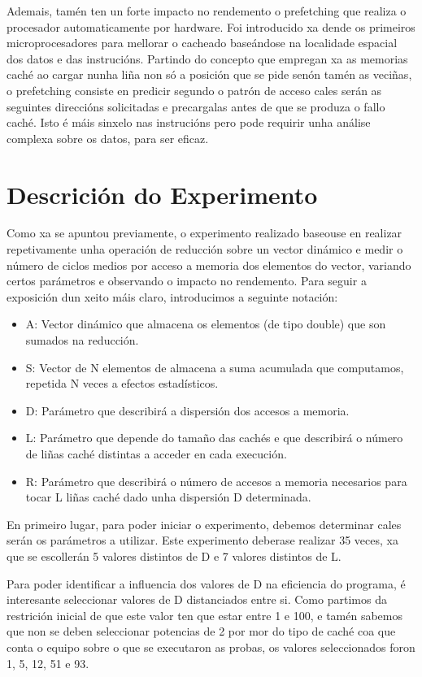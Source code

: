 \documentclass[letterpaper, 10 pt,spanish, conference]{ieeeconf}  %
\begin{document}
Ademais, tamén ten un forte impacto no rendemento o prefetching que realiza o procesador automaticamente por hardware. Foi introducido xa dende os primeiros microprocesadores para mellorar o cacheado baseándose na localidade espacial dos datos e das instrucións. Partindo do concepto que empregan xa as memorias caché ao cargar nunha liña non só a posición que se pide senón tamén as veciñas, o prefetching consiste en predicir segundo o patrón de acceso cales serán as seguintes direccións solicitadas e precargalas antes de que se produza o fallo caché. Isto é máis sinxelo nas instrucións pero pode requirir unha análise complexa sobre os datos, para ser eficaz.

\section{Descrición do Experimento}

Como xa se apuntou previamente, o experimento realizado baseouse en realizar repetivamente unha operación de reducción sobre un vector dinámico e medir o número de ciclos medios por acceso a memoria dos elementos do vector, variando certos parámetros e observando o impacto no rendemento. Para seguir a exposición dun xeito máis claro, introducimos a seguinte notación:

\begin{itemize}
    \item A: Vector dinámico que almacena os elementos (de tipo double) que son sumados na reducción.
    \item S: Vector de N elementos de almacena a suma acumulada que computamos, repetida N veces a efectos estadísticos.
    \item D: Parámetro que describirá a dispersión dos accesos a memoria.
    \item L: Parámetro que depende do tamaño das cachés e que describirá o número de liñas caché distintas a acceder en cada execución.
    \item R: Parámetro que describirá o número de accesos a memoria necesarios para tocar L liñas caché dado unha dispersión D determinada.
\end{itemize}

    En primeiro lugar, para poder iniciar o experimento,
    debemos determinar cales serán os parámetros a utilizar. Este experimento deberase realizar 35 veces, xa que se escollerán 5 valores distintos de D e 7 valores distintos de L. 
    
    Para poder identificar a influencia dos valores de D na eficiencia do programa, é interesante seleccionar valores de D distanciados entre si. Como partimos da restrición inicial de que este valor ten que estar entre 1 e 100, e tamén sabemos que non se deben seleccionar potencias de 2 por mor do tipo de caché coa que conta o equipo sobre o que se executaron as probas, os valores seleccionados foron 1, 5, 12, 51 e 93.
    
\end{document}

